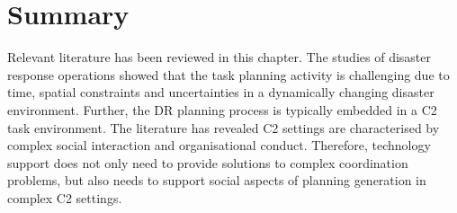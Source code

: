 

\section{Summary}
Relevant literature has been reviewed in this chapter. The studies of disaster response operations showed that the task planning activity is challenging due to time, spatial constraints and uncertainties in a dynamically changing disaster environment. Further, the \ac{DR} planning process is typically embedded in a \acf{C2} task environment. The literature has revealed \ac{C2} settings are characterised by complex social interaction and organisational conduct. Therefore, technology support does not only need to provide solutions to complex coordination problems, but also needs to support social aspects of planning generation in complex \ac{C2} settings. \\

